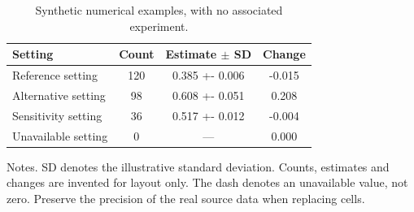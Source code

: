\documentclass[11pt,a4paper]{article}
\begin{document}
\begin{table}[htbp]
\centering
\caption{Synthetic numerical examples, with no associated experiment.}
\label{tab:uncertainty}
\small
\begin{tabularx}{\linewidth}{@{}Y S[table-format=3.0]
  S[table-format=1.3(3)] S[table-format=-1.3]@{}}
\toprule
Setting & {Count} & {Estimate $\pm$ SD} & {Change}\\
\midrule
Reference setting & 120 & 0.385 +- 0.006 & -0.015\\
Alternative setting & 98 & 0.608 +- 0.051 & 0.208\\
Sensitivity setting & 36 & 0.517 +- 0.012 & -0.004\\
Unavailable setting & 0 &  & 0.000\\
\bottomrule
\end{tabularx}
\par\smallskip\footnotesize\raggedright
Notes. SD denotes the illustrative standard deviation. Counts, estimates and
changes are invented for layout only. The dash denotes an unavailable value,
not zero. Preserve the precision of the real source data when replacing cells.
\end{table}
\end{document}

